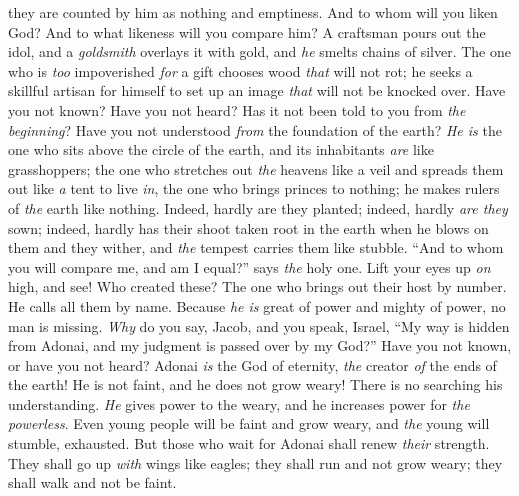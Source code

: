 \begin{biblechapter}
they are counted by him as nothing and emptiness.
\verse And to whom will you liken God? 
And to what likeness will you compare him?
\verse A craftsman pours out the idol, 
and a \textit{goldsmith} overlays it with gold, 
and \textit{he} smelts chains of silver.
\verse The one who is \textit{too} impoverished \textit{for} a gift chooses wood \textit{that} will not rot; 
he seeks a skillful artisan for himself to set up an image \textit{that} will not be knocked over.
\verse Have you not known? 
Have you not heard? 
Has it not been told to you from \textit{the} \textit{beginning}? 
Have you not understood \textit{from} the foundation of the earth?
\verse \textit{He is} the one who sits above the circle of the earth, 
and its inhabitants \textit{are} like grasshoppers; 
the one who stretches out \textit{the} heavens like a veil 
and spreads them out like \textit{a} tent to live \textit{in},
\verse the one who brings princes to nothing; 
he makes rulers of \textit{the} earth like nothing.
\verse Indeed, hardly are they planted; indeed, hardly \textit{are they} sown; 
indeed, hardly has their shoot taken root in the earth 
when he blows on them and they wither, 
and \textit{the} tempest carries them like stubble.
\verse “And to whom you will compare me, and am I equal?” says \textit{the} holy one.
\verse Lift your eyes up \textit{on} high, and see! Who created these? 
The one who brings out their host by number. 
He calls all them by name. 
Because \textit{he is} great of power 
and mighty of power, no man is missing.
\verse \textit{Why} do you say, Jacob, 
and you speak, Israel, 
“My way is hidden from Adonai, 
and my judgment is passed over by my God?”
\verse Have you not known, 
or have you not heard? 
Adonai \textit{is} the God of eternity, 
\textit{the} creator \textit{of} the ends of the earth! 
He is not faint, and he does not grow weary! 
There is no searching his understanding.
\verse \textit{He} gives power to the weary, 
and he increases power for \textit{the powerless}.
\verse Even young people will be faint and grow weary, 
and \textit{the} young will stumble, exhausted.
\verse But those who wait for Adonai shall renew \textit{their} strength. 
They shall go up \textit{with} wings like eagles; 
they shall run and not grow weary; 
they shall walk and not be faint.
\end{biblechapter}

